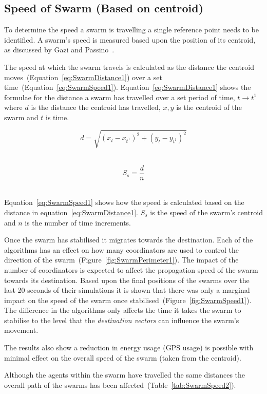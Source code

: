 \subsection{Speed of Swarm (Based on centroid)}
To determine the speed a swarm is travelling a single reference point needs to be identified. A swarm's speed is measured based upon the position of its centroid, as discussed by Gazi and Passino~\cite{GP:04, GP:02}.

The speed at which the swarm travels is calculated as the distance the centroid moves~(Equation~\ref{eq:SwarmDistance1}) over a set time~(Equation~\ref{eq:SwarmSpeed1}). Equation~\ref{eq:SwarmDistance1} shows the formulae for the distance a swarm has travelled over a set period of time, $t \rightarrow t^{1}$ where $d$ is the distance the centroid has travelled, $x,y$ is the centroid of the swarm and $t$ is time.

\begin{equation}\label{eq:SwarmDistance1}
d = \sqrt{(x_{t}-x_{t^1})^2+(y_{t}-y_{t^1})^2}
\end{equation}‎

\begin{equation}\label{eq:SwarmSpeed1}
S_s = \frac{d}{n}
\end{equation}‎

Equation~\ref{eq:SwarmSpeed1} shows how the speed is calculated based on the distance in equation~\ref{eq:SwarmDistance1}. $S_s$ is the speed of the swarm's centroid and $n$ is the number of time increments.

Once the swarm has stabilised it migrates towards the destination. Each of the algorithms has an effect on how many coordinators are used to control the direction of the swarm~(Figure~\ref{fig:SwarmPerimeter1}). The impact of the number of coordinators is expected to affect the propagation speed of the swarm towards its destination. Based upon the final positions of the swarms over the last 20 seconds of their simulations it is shown that there was only a marginal impact on the speed of the swarm once stabilised~(Figure~\ref{fig:SwarmSpeed1}). The difference in the algorithms only affects the time it takes the swarm to stabilise to the level that the \textit{destination vectors} can influence the swarm's movement.

The results also show a reduction in energy usage (GPS usage) is possible with minimal effect on the overall speed of the swarm (taken from the centroid). 

Although the agents within the swarm have travelled the same distances the overall path of the swarms has been affected~(Table~\ref{tab:SwarmSpeed2}).

